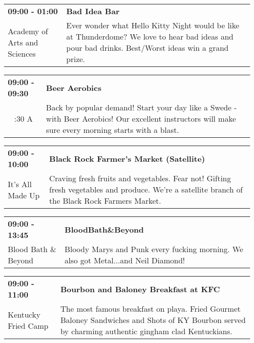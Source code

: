 \begin{tabular}{ p{1in} p{2.2in} }
    \textbf{09:00 - 01:00} & \textbf{Bad Idea Bar} \\
    Academy of Arts and Sciences \newline  & Ever wonder what Hello Kitty Night would be like at Thunderdome? We love to hear bad ideas and pour bad drinks. Best/Worst ideas win a grand prize. \\
    \hline 
\end{tabular}
    
\begin{tabular}{ p{1in} p{2.2in} }
    \textbf{09:00 - 09:30} & \textbf{Beer Aerobics} \\
    ~ \newline 4:30 A & Back by popular demand! Start your day like a Swede - with Beer Aerobics! Our excellent instructors will make sure every morning starts with a blast. \\
    \hline 
\end{tabular}
    
\begin{tabular}{ p{1in} p{2.2in} }
    \textbf{09:00 - 10:00} & \textbf{Black Rock Farmer's Market (Satellite)} \\
    It's All Made Up \newline  & Craving fresh fruits and vegetables. Fear not! Gifting fresh vegetables and produce. We're a satellite branch of the Black Rock Farmers Market. \\
    \hline 
\end{tabular}
    
\begin{tabular}{ p{1in} p{2.2in} }
    \textbf{09:00 - 13:45} & \textbf{BloodBath\&Beyond} \\
    Blood Bath \& Beyond \newline  & Bloody Marys and Punk every fucking morning. We also got Metal...and Neil Diamond! \\
    \hline 
\end{tabular}
    
\begin{tabular}{ p{1in} p{2.2in} }
    \textbf{09:00 - 11:00} & \textbf{Bourbon and Baloney Breakfast at KFC} \\
    Kentucky Fried Camp \newline  & The most famous breakfast on playa. Fried Gourmet Baloney Sandwiches and Shots of KY Bourbon served by charming authentic gingham clad Kentuckians. \\
    \hline 
\end{tabular}
    
